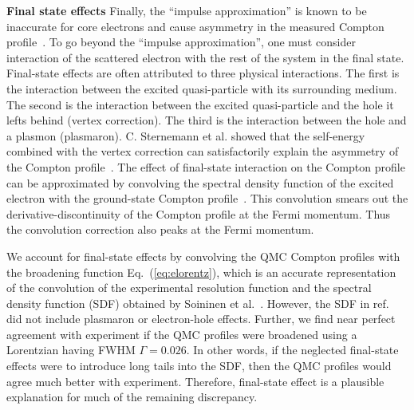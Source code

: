 \documentclass[aps,prb,showpacs,preprintnumbers,amsmath,amssymb,superscriptaddress,twocolumn]{revtex4-1}
\begin{document}
{\bf Final state effects} Finally, the ``impulse approximation'' is known to be inaccurate for core electrons and cause asymmetry in the measured Compton profile~\cite{Eisenberger1970,Sternemann2000,Huotari2001}. To go beyond the ``impulse approximation'', one must consider interaction of the scattered electron with the rest of the system in the final state. Final-state effects are often attributed to three physical interactions. The first is the interaction between the excited quasi-particle with its surrounding medium. The second is the interaction between the excited quasi-particle and the hole it lefts behind (vertex correction). The third is the interaction between the hole and a plasmon (plasmaron). C. Sternemann et al. showed that the self-energy combined with the vertex correction can satisfactorily explain the asymmetry of the Compton profile~\cite{Sternemann2000}. The effect of final-state interaction on the Compton profile can be approximated by convolving the spectral density function of the excited electron with the ground-state Compton profile~\cite{Soininen2001}. This convolution smears out the derivative-discontinuity of the Compton profile at the Fermi momentum. Thus the convolution correction also peaks at the Fermi momentum.

We account for final-state effects by convolving the QMC Compton profiles with the broadening function Eq.~(\ref{eq:elorentz}), which is an accurate representation of the convolution of the experimental resolution function and the spectral density function (SDF) obtained by Soininen et al.~\cite{Soininen2001}. However, the SDF in ref.~\cite{Soininen2001} did not include plasmaron or electron-hole effects. Further, we find near perfect agreement with experiment if the QMC profiles were broadened using a Lorentzian having FWHM $\Gamma=0.026$. In other words, if the neglected final-state effects were to introduce long tails into the SDF, then the QMC profiles would agree much better with experiment. Therefore, final-state effect is a plausible explanation for much of the remaining discrepancy.


\end{document}
